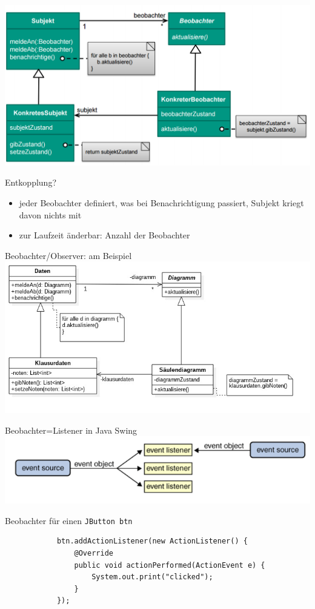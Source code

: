 \documentclass[18pt]{beamer}
\begin{document}
	\begin{frame}{}
		\includegraphics[keepaspectratio, width=\textwidth, height=\textheight]{pics/tut3/obs.png}
		\pause
		\begin{block}{Entkopplung?}
		\begin{itemize}
			\pause 
			\item jeder Beobachter definiert, was bei Benachrichtigung passiert, Subjekt kriegt davon nichts mit \pause
			\item zur Laufzeit änderbar: Anzahl der Beobachter
		\end{itemize}
		\end{block}
	\end{frame}

	\begin{frame}{Beobachter/Observer: am Beispiel}
		\includegraphics[keepaspectratio, width=\textwidth, height=\textheight]{pics/tut3/observer_example.jpg}
	\end{frame}

\begin{frame}[fragile]{Beobachter=Listener in Java Swing}
	\centering
	\includegraphics[scale=0.5]{pics/tut3/listener.png}
	\pause
	\begin{block}{Beobachter für einen \texttt{JButton btn}}
		\begin{verbatim}
			btn.addActionListener(new ActionListener() {
			    @Override
			    public void actionPerformed(ActionEvent e) {
			        System.out.print("clicked");
			    }
			});
		\end{verbatim}
	\end{block}
\end{frame}
\end{document}
